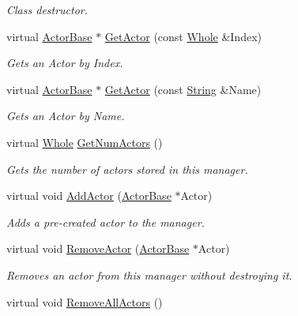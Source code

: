 \begin{DoxyCompactItemize}
\begin{DoxyCompactList}\small\item\em Class destructor. \item\end{DoxyCompactList}\item 
virtual \hyperlink{classphys_1_1ActorBase}{ActorBase} $\ast$ \hyperlink{classphys_1_1ActorManager_ac2700addfdd0d4fc97dc9afe30b3923d}{GetActor} (const \hyperlink{namespacephys_a460f6bc24c8dd347b05e0366ae34f34a}{Whole} \&Index)
\begin{DoxyCompactList}\small\item\em Gets an Actor by Index. \item\end{DoxyCompactList}\item 
virtual \hyperlink{classphys_1_1ActorBase}{ActorBase} $\ast$ \hyperlink{classphys_1_1ActorManager_a42dc22df8b201f25f41676b303e5bf95}{GetActor} (const \hyperlink{namespacephys_aa03900411993de7fbfec4789bc1d392e}{String} \&Name)
\begin{DoxyCompactList}\small\item\em Gets an Actor by Name. \item\end{DoxyCompactList}\item 
virtual \hyperlink{namespacephys_a460f6bc24c8dd347b05e0366ae34f34a}{Whole} \hyperlink{classphys_1_1ActorManager_a9ff2ecc8c6b483729ad59a731a737775}{GetNumActors} ()
\begin{DoxyCompactList}\small\item\em Gets the number of actors stored in this manager. \item\end{DoxyCompactList}\item 
virtual void \hyperlink{classphys_1_1ActorManager_abde76a5c732b77d7bab431d0ef0220ae}{AddActor} (\hyperlink{classphys_1_1ActorBase}{ActorBase} $\ast$Actor)
\begin{DoxyCompactList}\small\item\em Adds a pre-\/created actor to the manager. \item\end{DoxyCompactList}\item 
virtual void \hyperlink{classphys_1_1ActorManager_ac5d3eaf8733a53f433293b0341db55f2}{RemoveActor} (\hyperlink{classphys_1_1ActorBase}{ActorBase} $\ast$Actor)
\begin{DoxyCompactList}\small\item\em Removes an actor from this manager without destroying it. \item\end{DoxyCompactList}\item 
\hypertarget{classphys_1_1ActorManager_aab80825c7dfbbcf33712d94e925faae8}{
virtual void \hyperlink{classphys_1_1ActorManager_aab80825c7dfbbcf33712d94e925faae8}{RemoveAllActors} ()}
\label{d3/dcf/classphys_1_1ActorManager_aab80825c7dfbbcf33712d94e925faae8}


\end{DoxyCompactItemize}
